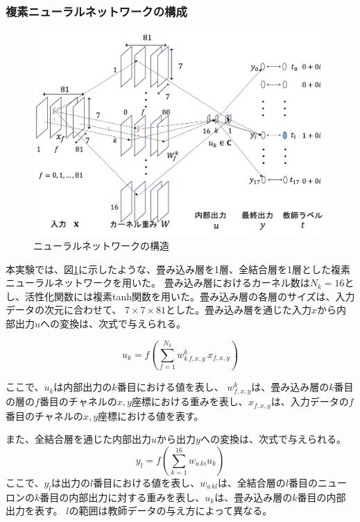 \documentclass[11pt,a4paper,uplatex]{ujarticle}
\begin{document}
  \subsubsection{複素ニューラルネットワークの構成}
  \begin{figure}[hbtp]
    \centering
    \includegraphics[keepaspectratio, width=130mm]{Images/network.png}
    \caption{ニューラルネットワークの構造}
    \label{fig:neuralnet}
  \end{figure}
  本実験では、図\ref{fig:neuralnet}に示したような、畳み込み層を1層、全結合層を1層とした複素ニューラルネットワークを用いた。
  畳み込み層におけるカーネル数は$N_k = 16$とし、活性化関数には複素tanh関数を用いた。畳み込み層の各層のサイズは、入力データの次元に合わせて、
  $7\times7\times81$とした。畳み込み層を通じた入力$x$から内部出力$u$への変換は、次式で与えられる。

  \begin{equation}
    u_k = f\left(\sum_{f=1}^{N_k} w_{k\,f,x,y}^k\, x_{f,x,y}\right)
  \end{equation}

  ここで、$u_k$は内部出力の$k$番目における値を表し、
  $w_{f,x,y}^k$は、畳み込み層の$k$番目の層の$f$番目のチャネルの$x,y$座標における重みを表し、$x_{f,x,y}$は、入力データの$f$番目のチャネルの$x,y$座標における値を表す。

  また、全結合層を通じた内部出力$u$から出力$y$への変換は、次式で与えられる。
  \begin{equation}
    y_l = f\left(\sum_{k=1}^{16} w_{a\,ki} u_k\right)
  \end{equation}
  ここで、$y_l$は出力の$l$番目における値を表し、$w_{a\,kl}$は、全結合層の$l$番目のニューロンの$k$番目の内部出力に対する重みを表し、$u_k$は、畳み込み層の$k$番目の内部出力を表す。
  $l$の範囲は教師データの与え方によって異なる。
\end{document}
